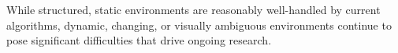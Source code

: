 \documentclass[12pt]{article}
\begin{document}
    While structured, static environments are reasonably well-handled by current algorithms, dynamic, changing, or visually ambiguous environments continue to pose significant difficulties that drive ongoing research.





\end{document}
